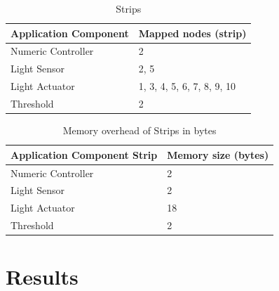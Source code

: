 \begin{table}
\centering
\caption{Strips}
\label{tbl:mapping-result}
  \begin{tabular}{|l|l|}
  \hline
  \textbf{Application Component} & \textbf{Mapped nodes (strip)} \\
  \hline
  Numeric Controller & 2 \\
  \hline
  Light Sensor & 2, 5 \\
  \hline
  Light Actuator & 1, 3, 4, 5, 6, 7, 8, 9, 10 \\
  \hline
  Threshold & 2 \\
  \hline
  \end{tabular}
\end{table}

\begin{table}
\centering
\caption{Memory overhead of Strips in bytes}
\label{tbl:results-memory-overhead-strip}
  \begin{tabular}{|l|l|}
  \hline
  \textbf{Application Component Strip} & \textbf{Memory size (bytes)} \\
  \hline
  Numeric Controller & 2 \\
  \hline
  Light Sensor & 2 \\
  \hline
  Light Actuator & 18 \\
  \hline
  Threshold & 2 \\
  \hline
  \end{tabular}
\end{table}







\section{Results}
\label{s:results}

